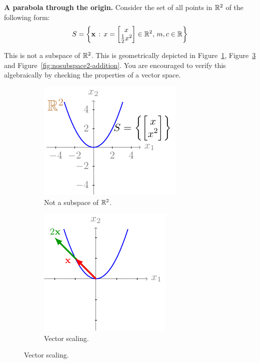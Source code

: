 \begin{boxedstuff}
\begin{example}
    \textbf{A parabola through the origin.} Consider the set of all points in $\mathbb{R}^2$ of the following form:
    \[ S = \lc \mf{x} \, : \, x = \bmxc x \\ \frac{1}{2}x^2 \emx \in \mb{R}^2, \, m, c \in \mb{R} \rc \]

    This is not a subspace of $\mathbb{R}^2$. This is geometrically depicted in Figure~\ref{fig:nosubspace2}, Figure~\ref{fig:nosubspace2-scale} and Figure~\ref{fig:nosubspace2-addition}. You are encouraged to verify this algebraically by checking the properties of a vector space.
    \label{example:nosubspace-parabola}
\end{example}
\end{boxedstuff}
\begin{figure}[h]
    \centering
    \begin{subfigure}[b]{0.32\textwidth}
        \includegraphics{figure/chapter01/nosubspace2(a).pdf}
        \caption{Not a subspace of $\mathbb{R}^2$.}
        \label{fig:nosubspace2}
    \end{subfigure}
    \begin{subfigure}[b]{0.32\textwidth}
        \centering
        \includegraphics{figure/chapter01/nosubspace2(b).pdf}
        \caption{Vector scaling.}
        \label{fig:nosubspace2-scale}

\end{subfigure}
\end{figure}
